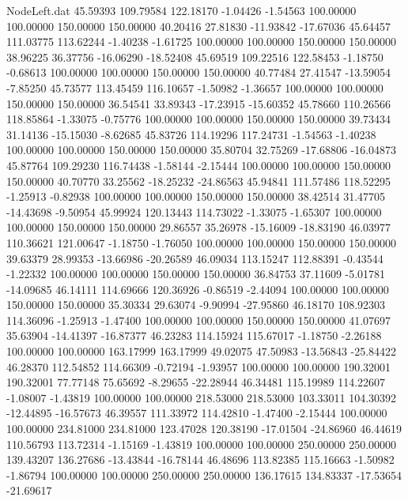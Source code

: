 \begin{filecontents}{NodeLeft.dat}
  45.59393  109.79584  122.18170    -1.04426   -1.54563  100.00000  100.00000  150.00000  150.00000   40.20416   27.81830  -11.93842  -17.67036
  45.64457  111.03775  113.62244    -1.40238   -1.61725  100.00000  100.00000  150.00000  150.00000   38.96225   36.37756  -16.06290  -18.52408
  45.69519  109.22516  122.58453    -1.18750   -0.68613  100.00000  100.00000  150.00000  150.00000   40.77484   27.41547  -13.59054   -7.85250
  45.73577  113.45459  116.10657    -1.50982   -1.36657  100.00000  100.00000  150.00000  150.00000   36.54541   33.89343  -17.23915  -15.60352
  45.78660  110.26566  118.85864    -1.33075   -0.75776  100.00000  100.00000  150.00000  150.00000   39.73434   31.14136  -15.15030   -8.62685
  45.83726  114.19296  117.24731    -1.54563   -1.40238  100.00000  100.00000  150.00000  150.00000   35.80704   32.75269  -17.68806  -16.04873
  45.87764  109.29230  116.74438    -1.58144   -2.15444  100.00000  100.00000  150.00000  150.00000   40.70770   33.25562  -18.25232  -24.86563
  45.94841  111.57486  118.52295    -1.25913   -0.82938  100.00000  100.00000  150.00000  150.00000   38.42514   31.47705  -14.43698   -9.50954
  45.99924  120.13443  114.73022    -1.33075   -1.65307  100.00000  100.00000  150.00000  150.00000   29.86557   35.26978  -15.16009  -18.83190
  46.03977  110.36621  121.00647    -1.18750   -1.76050  100.00000  100.00000  150.00000  150.00000   39.63379   28.99353  -13.66986  -20.26589
  46.09034  113.15247  112.88391    -0.43544   -1.22332  100.00000  100.00000  150.00000  150.00000   36.84753   37.11609   -5.01781  -14.09685
  46.14111  114.69666  120.36926    -0.86519   -2.44094  100.00000  100.00000  150.00000  150.00000   35.30334   29.63074   -9.90994  -27.95860
  46.18170  108.92303  114.36096    -1.25913   -1.47400  100.00000  100.00000  150.00000  150.00000   41.07697   35.63904  -14.41397  -16.87377
  46.23283  114.15924  115.67017    -1.18750   -2.26188  100.00000  100.00000  163.17999  163.17999   49.02075   47.50983  -13.56843  -25.84422
  46.28370  112.54852  114.66309    -0.72194   -1.93957  100.00000  100.00000  190.32001  190.32001   77.77148   75.65692   -8.29655  -22.28944
  46.34481  115.19989  114.22607    -1.08007   -1.43819  100.00000  100.00000  218.53000  218.53000  103.33011  104.30392  -12.44895  -16.57673
  46.39557  111.33972  114.42810    -1.47400   -2.15444  100.00000  100.00000  234.81000  234.81000  123.47028  120.38190  -17.01504  -24.86960
  46.44619  110.56793  113.72314    -1.15169   -1.43819  100.00000  100.00000  250.00000  250.00000  139.43207  136.27686  -13.43844  -16.78144
  46.48696  113.82385  115.16663    -1.50982   -1.86794  100.00000  100.00000  250.00000  250.00000  136.17615  134.83337  -17.53654  -21.69617

\end{filecontents}
